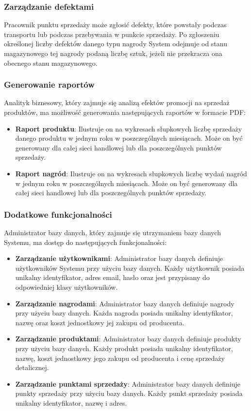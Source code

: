 \documentclass[a4paper,12pt]{article}
\begin{document}
\subsubsection{Zarządzanie defektami}

Pracownik punktu sprzedaży może zgłosić defekty, które powstały podczas transportu lub podczas przebywania w punkcie sprzedaży.
Po zgłoszeniu określonej liczby defektów danego typu nagrody System odejmuje od stanu magazynowego tej nagrody podaną liczbę sztuk, jeżeli nie przekracza ona obecnego stanu magazynowego.

\subsubsection{Generowanie raportów}

Analityk biznesowy, który zajmuje się analizą efektów promocji na sprzedaż produktów, ma możliwość generowania następujących raportów w formacie PDF:
\begin{itemize}
    \item \textbf{Raport produktu}:
    Ilustruje on na wykresach słupkowych liczbę sprzedaży danego produktu w jednym roku w poszczególnych miesiącach.
    Może on być generowany dla całej sieci handlowej lub dla poszczególnych punktów sprzedaży.
    \item \textbf{Raport nagród}:
    Ilustruje on na wykresach słupkowych liczbę wydań nagród w jednym roku w poszczególnych miesiącach.
    Może on być generowany dla całej sieci handlowej lub dla poszczególnych punktów sprzedaży.
\end{itemize}

\subsubsection{Dodatkowe funkcjonalności}

Administrator bazy danych, który zajmuje się utrzymaniem bazy danych Systemu, ma dostęp do następujących funkcjonalności:
\begin{itemize}
    \item \textbf{Zarządzanie użytkownikami}:
    Administrator bazy danych definiuje użytkowników Systemu przy użyciu bazy danych.
    Każdy użytkownik posiada unikalny identyfikator, adres email, hasło oraz jest przypisany do odpowiedniej klasy użytkowników.
    \item \textbf{Zarządzanie nagrodami}:
    Administrator bazy danych definiuje nagrody przy użyciu bazy danych.
    Każda nagroda posiada unikalny identyfikator, nazwę oraz koszt jednostkowy jej zakupu od producenta.
    \item \textbf{Zarządzanie produktami}:
    Administrator bazy danych definiuje produkty przy użyciu bazy danych.
    Każdy produkt posiada unikalny identyfikator, nazwę, koszt jednostkowy jego zakupu od producenta i cenę sprzedaży detalicznej.
    \item \textbf{Zarządzanie punktami sprzedaży}:
    Administrator bazy danych definiuje punkty sprzedaży przy użyciu bazy danych.
    Każdy punkt sprzedaży posiada unikalny identyfikator, nazwę i adres.
\end{itemize}
\end{document}
